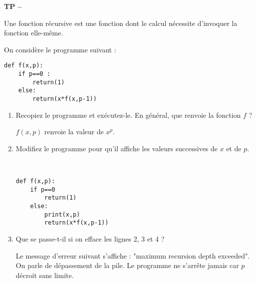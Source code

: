 

%




\begin{center}
{\Large\bf TP \no {\numero} -- \descrip}
\end{center}





\begin{defn}
Une fonction récursive est une fonction dont le calcul nécessite d'invoquer la fonction elle-même.
\end{defn}

\begin{exercice}\label{exponentiation naive}
On considère le programme suivant :
\begin{verbatim}
def f(x,p):
	if p==0 :
		return(1)
	else:
		return(x*f(x,p-1))		
\end{verbatim}
\begin{enumerate}
\item Recopiez le programme et exécutez-le. En général, que renvoie la fonction $f$ ?
\begin{solution}
$f(x,p)$ renvoie la valeur de $x^p$.
\end{solution}
\item Modifiez le programme pour qu'il affiche les valeurs successives de $x$ et de $p$.
\begin{solution}~\\
\vspace{-0.7cm}
\begin{verbatim}
def f(x,p):
	if p==0
		return(1)
	else:
		print(x,p)
		return(x*f(x,p-1))	
\end{verbatim}
\end{solution}
\item Que se passe-t-il si on efface les lignes 2, 3 et 4 ? 
\begin{solution}
Le message d'erreur suivant s'affiche : "maximum recursion depth exceeded". On parle de dépassement de la pile. Le programme ne s'arrête jamais car $p$ décroit sans limite.
\end{solution}
\end{enumerate}
\end{exercice}



